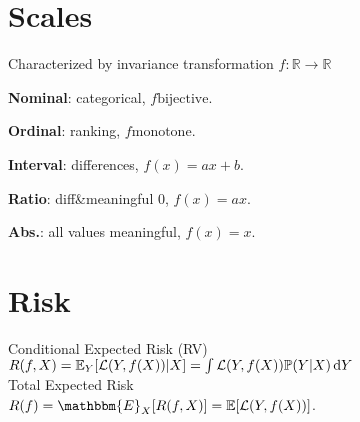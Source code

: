 




\section*{Scales}

Characterized by invariance transformation $f: \mathbb{R} \rightarrow \mathbb{R}$

\textbf{Nominal}: categorical, $f \textrm{bijective}$.

\textbf{Ordinal}: ranking, $f \textrm{monotone}$.

\textbf{Interval}: differences, $f(x) = ax + b$.

\textbf{Ratio}: diff\&meaningful 0, $f(x) = ax$.

\textbf{Abs.}: all values meaningful, $f(x) = x$. 

\section*{Risk}
Conditional Expected Risk (RV)\\
$R(f, X) = \mathbb{E}_Y[\mathcal{L}(Y,f(X))|X] = \int \mathcal{L}(Y,f(X))\mathbb{P}(Y|X)\operatorname{d\!} Y$\\
Total Expected Risk\\
$R(f) = \mathbbm{E}_{X}[R(f,X)] = \E[\mathcal{L}(Y, f(X))]$.


